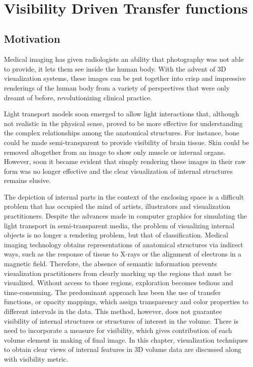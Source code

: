 
\begingroup
    \fontsize{10pt}{12pt}\selectfont
    \begin{verbatim}  
         
    \end{verbatim}  
\endgroup

\chapter{Visibility Driven Transfer functions}\label{chap:ch4_abbr}

\section{Motivation}

Medical imaging has given radiologists an ability that photography was not able to provide, it lets them see inside the human body. With the advent of 3D visualization systems, these images can be put together into crisp and impressive renderings of the human body from a variety of perspectives that were only dreamt of before, revolutionizing clinical practice.

Light transport models soon emerged to allow light interactions that, although not realistic in the physical sense, proved to be more effective for understanding the complex relationships among the anatomical structures. For instance, bone could be made semi-transparent to provide visibility of brain tissue. Skin could be removed altogether from an image to show only muscle or internal organs. However, soon it
became evident that simply rendering these images in their raw form was no longer effective and the clear visualization of internal structures remains elusive.

The depiction of internal parts in the context of the enclosing space is a difficult problem that has occupied the mind of artists, illustrators and visualization practitioners. Despite the advances made in computer graphics for simulating the light transport in semi-transparent media, the problem of visualizing internal objects is no longer a rendering problem, but that of classification. Medical imaging technology obtains representations of anatomical structures via indirect ways, such as the response of tissue to X-rays or the alignment of electrons in a magnetic field. Therefore, the absence of semantic information prevents visualization practitioners from clearly marking up the regions that must be visualized. Without access to those regions, exploration becomes tedious and time-consuming. The predominant approach has been the use of transfer functions, or opacity mappings, which assign transparency and color properties to different intervals in the data. This method, however, does not guarantee visibility of internal structures or structures of interest in the volume. There is need to incorporate a measure for visibility, which gives contribution of each volume element in making of final image. In this chapter, visualization techniques to obtain clear views of internal features in 3D volume data are discussed along with visibility metric.

